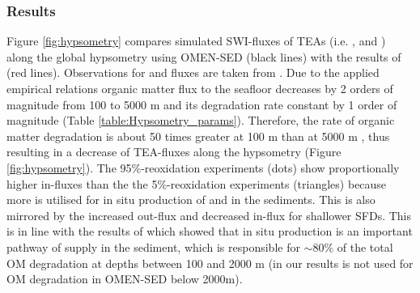\documentclass[gmd, manuscript]{copernicus}
\begin{document}
\subsubsection{Results}
Figure \ref{fig:hypsometry} compares simulated SWI-fluxes of TEAs (i.e. ,  and ) along the global hypsometry using OMEN-SED (black lines) with the results of \citet{thullner_global_scale_2009} 
(red lines). 
Observations for  and  fluxes are taken from \citet{middelburg_denitrification_1996}. 
Due to the applied empirical relations organic matter flux to the seafloor decreases by 2 orders of magnitude from 100 to 5000 m and its degradation rate constant by 1 order of magnitude (Table \ref{table:Hypsometry_params}). 
Therefore, the rate of organic matter degradation is about 50 times greater at 100 m than at 5000 m \citep[compare][]{thullner_global_scale_2009}, thus resulting in a decrease of TEA-fluxes along the 
hypsometry (Figure \ref{fig:hypsometry}). 
The 95\%-reoxidation experiments (dots) show proportionally higher  in-fluxes than the the 5\%-reoxidation experiments (triangles) because more  is utilised for 
in situ production of  and  in the sediments. This is also mirrored by the increased  out-flux and decreased  in-flux for shallower SFDs. 
This is in line with the results of \citet{thullner_global_scale_2009} which showed that in situ production is an important pathway of  supply in the sediment, which is responsible for $\sim$80\% of the total OM degradation at depths 
between 100 and 2000 m (in our results  is not used for OM degradation in OMEN-SED below 2000m).
\end{document}
